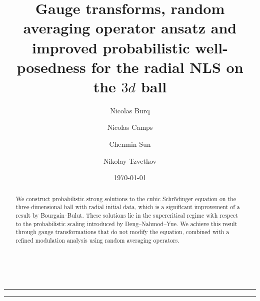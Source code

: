 \documentclass[11pt,reqno,english]{amsart}
\numberwithin{equation}{section}
\theoremstyle{plain}
\theoremstyle{definition}
\theoremstyle{remark}
\begin{document}
	
	\title[
	Probabilistic well-posedness for the radial NLS on the $3d$ ball
	]{	Gauge transforms, random averaging operator ansatz and improved probabilistic well-posedness for the radial NLS on the $3d$ ball }
	
	\author{Nicolas Burq}
	\address{Universit\'e Paris-Saclay, Laboratoire de Math\'ematique d’Orsay, UMR CNRS 8628, Orsay,
		France, and Institut universitaire de France }
	
	\author{Nicolas Camps}
	\address{Univ Rennes, IRMAR - UMR CNRS 6625, F-35000 Rennes, France}
	
	\author{Chenmin Sun}
	\address{CNRS, Universit\'e Paris-Est Cr\'eteil,  Laboratoire d'Analyse et de Math\'ematiques Appliqu\'ees, UMR CNRS 8050, Cr\'eteil, France}
	
	\author{Nikolay Tzvetkov}
	\address{Ecole Normale Sup\'erieure de Lyon, Unit\'e de Math\'ematiques Pures et Appliqu\'es,  UMR CNRS 5669, Lyon, France}
	
	
	
	
	\date{\today}
	
	
	\begin{abstract}
	We construct probabilistic strong solutions to the cubic Schr\"odinger equation on the three-dimensional ball
	with radial initial data, which is a significant improvement of a result by Bourgain--Bulut.
	These solutions lie in the supercritical regime with respect to the probabilistic scaling introduced by Deng--Nahmod--Yue.
	We achieve this result through gauge transformations that do not modify the equation, combined with a refined modulation analysis using random averaging operators.
\end{abstract}
	
	
	\ \vskip -1cm  \hrule \vskip 1cm \vspace{-8pt}
	\maketitle 
	{ \textwidth=4cm \hrule}
	
	
	
	\maketitle
	\setcounter{tocdepth}{1}
	\tableofcontents
	
\end{document}
